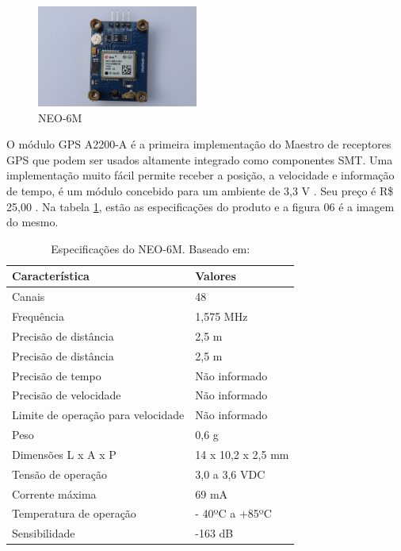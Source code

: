  \begin{figure}[h]
   \centering
   \includegraphics[width=200px, scale=1]{figuras/gps_neo}
   \caption{NEO-6M  \cite{14gps}}
 \label{fig:gps_neo}
 \end{figure}

 O módulo GPS A2200-A é a primeira implementação do Maestro de receptores
 GPS que podem ser usados altamente integrado como componentes SMT. Uma
 implementação muito fácil permite
 receber a posição, a velocidade e informação de tempo, é um módulo concebido
 para um ambiente de 3,3 V \cite{15gps}. Seu preço é R\$ 25,00 \cite{16gps}. Na tabela \ref{table:especificacao_gps_neo6m},
 estão as especificações do produto e a figura 06 é a imagem do mesmo.

 \begin{table}[ht]
 \caption{Especificações do NEO-6M. Baseado em: \cite{15gps}}
 \centering
 \begin{tabular}{| l |  p{5cm} |}
 \hline
 Característica & Valores \\
 \hline
 Canais & 48 \\
 \hline
 Frequência & 1,575 MHz \\
 \hline
 Precisão de distância & 2,5 m \\
 \hline
 Precisão de distância & 2,5 m \\
 \hline
 Precisão de tempo & Não informado \\
 \hline
 Precisão de velocidade & Não informado \\
 \hline
 Limite de operação para velocidade & Não informado \\
 \hline
 Peso & 0,6 g \\
 \hline
 Dimensões L x A x P & 14 x 10,2 x 2,5 mm \\
 \hline
 Tensão de operação & 3,0 a 3,6 VDC \\
 \hline
 Corrente máxima & 69 mA \\
 \hline
 Temperatura de operação & - 40ºC a +85ºC \\
 \hline
 Sensibilidade & -163 dB \\
 \hline
 \end{tabular}
 \label{table:especificacao_gps_neo6m}
 \end{table}

